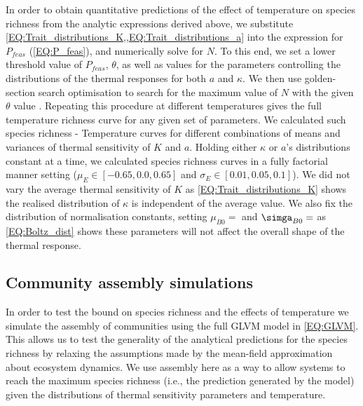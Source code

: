 \documentclass{article}
\begin{document}
In order to obtain quantitative predictions of the effect of temperature on species richness from the analytic expressions derived above,  we substitute \cref{EQ:Trait_distributions_K,,EQ:Trait_distributions_a} into the expression for $P_{feas}$ (\cref{EQ:P_feas}), and numerically solve for $N$. To this end, we set a lower threshold value of $P_{feas}$, $\theta$, as well as values for the parameters controlling the distributions of the thermal responses for both $a$ and $\kappa$. We then use golden-section search optimisation to search for the maximum value of $N$ with the given $\theta$ value \citep{Mogensen2018}. Repeating this procedure at different temperatures gives the full temperature richness curve for any given set of parameters. We calculated such species richness - Temperature curves for different combinations of means and variances of thermal sensitivity of $K$ and $a$. Holding either $\kappa$ or $a$'s distributions constant at a time, we calculated species richness curves in a fully factorial manner setting ($\mu_{E} \in [-0.65, 0.0, 0.65]$ and $\sigma_{E} \in [0.01, 0.05, 0.1]$). We did not vary the average thermal sensitivity of $K$ as \cref{EQ:Trait_distributions_K} shows the realised distribution of $\kappa$ is independent of the average value. We also fix the distribution of normalisation constants, setting $\mu_{B0} = $ and $\simga_{B0} =$ as \cref{EQ:Boltz_dist} shows these parameters will not affect the overall shape of the thermal response. 

\subsection*{Community assembly simulations}

In order to test the bound on species richness and the effects of temperature we simulate the assembly of communities using the full GLVM model in \cref{EQ:GLVM}. This allows us to test the generality of the analytical predictions for the species richness by relaxing the assumptions made by the mean-field approximation about ecosystem dynamics. We use assembly here as a way to allow systems to reach the maximum species richness (i.e., the prediction generated by the model) given the distributions of thermal sensitivity parameters and temperature. 
\end{document}
